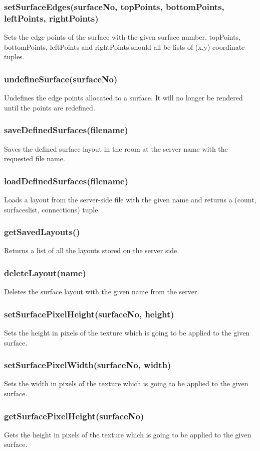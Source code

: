 \documentclass{acm_proc_article-sp}
\begin{document}
\subsubsection{setSurfaceEdges(surfaceNo, topPoints, bottomPoints, leftPoints, rightPoints)}
Sets the edge points of the surface with the given surface number. topPoints, bottomPoints, leftPoints and rightPoints should all be lists of (x,y) coordinate tuples.
\subsubsection{undefineSurface(surfaceNo)}
Undefines the edge points allocated to a surface. It will no longer be rendered until the points are redefined.
\subsubsection{saveDefinedSurfaces(filename)}
Saves the defined surface layout in the room at the server name with the requested file name.
\subsubsection{loadDefinedSurfaces(filename)}
Loads a layout from the server-side file with the given name and returns a (count, surfaceslist, connections) tuple.
\subsubsection{getSavedLayouts()}
Returns a list of all the layouts stored on the server side.
\subsubsection{deleteLayout(name)}
Deletes the surface layout with the given name from the server.
\subsubsection{setSurfacePixelHeight(surfaceNo, height)}
Sets the height in pixels of the texture which is going to be applied to the given surface.
\subsubsection{setSurfacePixelWidth(surfaceNo, width)}
Sets the width in pixels of the texture which is going to be applied to the given surface.
\subsubsection{getSurfacePixelHeight(surfaceNo)}
Gets the height in pixels of the texture which is going to be applied to the given surface.
\end{document}
